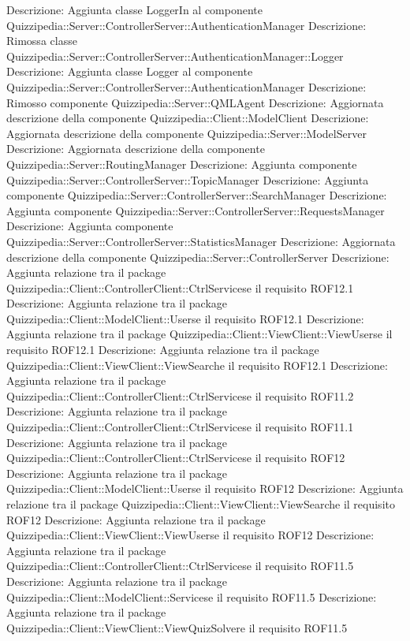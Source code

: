 Descrizione: Aggiunta classe LoggerIn al componente Quizzipedia::Server::ControllerServer::AuthenticationManager 
Descrizione: Rimossa classe Quizzipedia::Server::ControllerServer::AuthenticationManager::Logger 
Descrizione: Aggiunta classe Logger al componente Quizzipedia::Server::ControllerServer::AuthenticationManager 
Descrizione: Rimosso componente Quizzipedia::Server::QMLAgent 
Descrizione: Aggiornata descrizione della componente Quizzipedia::Client::ModelClient 
Descrizione: Aggiornata descrizione della componente Quizzipedia::Server::ModelServer 
Descrizione: Aggiornata descrizione della componente Quizzipedia::Server::RoutingManager 
Descrizione: Aggiunta componente Quizzipedia::Server::ControllerServer::TopicManager 
Descrizione: Aggiunta componente Quizzipedia::Server::ControllerServer::SearchManager 
Descrizione: Aggiunta componente Quizzipedia::Server::ControllerServer::RequestsManager 
Descrizione: Aggiunta componente Quizzipedia::Server::ControllerServer::StatisticsManager 
Descrizione: Aggiornata descrizione della componente Quizzipedia::Server::ControllerServer 
Descrizione: Aggiunta relazione tra il package Quizzipedia::Client::ControllerClient::CtrlServicese il requisito ROF12.1 
Descrizione: Aggiunta relazione tra il package Quizzipedia::Client::ModelClient::Userse il requisito ROF12.1 
Descrizione: Aggiunta relazione tra il package Quizzipedia::Client::ViewClient::ViewUserse il requisito ROF12.1 
Descrizione: Aggiunta relazione tra il package Quizzipedia::Client::ViewClient::ViewSearche il requisito ROF12.1 
Descrizione: Aggiunta relazione tra il package Quizzipedia::Client::ControllerClient::CtrlServicese il requisito ROF11.2 
Descrizione: Aggiunta relazione tra il package Quizzipedia::Client::ControllerClient::CtrlServicese il requisito ROF11.1 
Descrizione: Aggiunta relazione tra il package Quizzipedia::Client::ControllerClient::CtrlServicese il requisito ROF12 
Descrizione: Aggiunta relazione tra il package Quizzipedia::Client::ModelClient::Userse il requisito ROF12 
Descrizione: Aggiunta relazione tra il package Quizzipedia::Client::ViewClient::ViewSearche il requisito ROF12 
Descrizione: Aggiunta relazione tra il package Quizzipedia::Client::ViewClient::ViewUserse il requisito ROF12 
Descrizione: Aggiunta relazione tra il package Quizzipedia::Client::ControllerClient::CtrlServicese il requisito ROF11.5 
Descrizione: Aggiunta relazione tra il package Quizzipedia::Client::ModelClient::Servicese il requisito ROF11.5 
Descrizione: Aggiunta relazione tra il package Quizzipedia::Client::ViewClient::ViewQuizSolvere il requisito ROF11.5 
